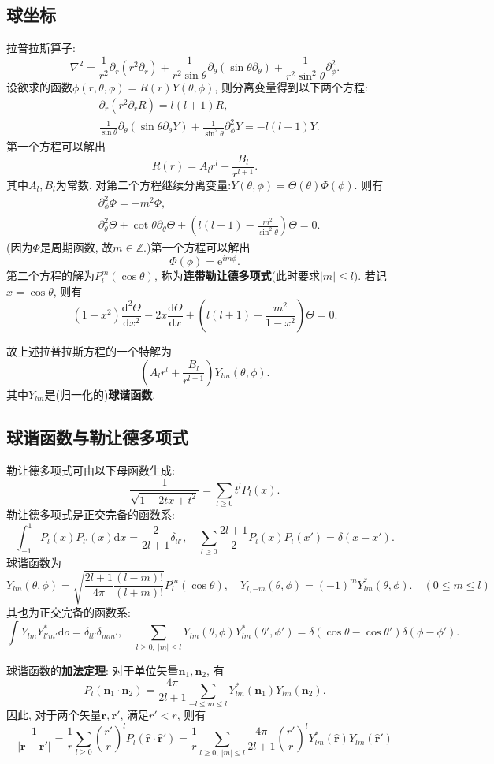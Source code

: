 \documentclass{article}
\newcommand\del{\partial}
\newcommand\bo[1]{\boldsymbol{#1}}
\renewcommand\d{\mathrm{d}}
\newcommand\e{\mathrm{e}}
\begin{document}
\subsection{球坐标}
拉普拉斯算子:
\[\nabla^2=\frac{1}{r^2}\del_r\left(r^2\del_r\right)+\frac{1}{r^2\sin\theta}\del_\theta\left(\sin\theta\del_\theta\right)+\frac{1}{r^2\sin^2\theta}\del_\phi^2.\]
设欲求的函数$\phi(r,\theta,\phi)=R(r)Y(\theta,\phi)$, 则分离变量得到以下两个方程:
\begin{align*}
    &\del_r\left(r^2\del_rR\right)=l(l+1)R,\\
    &\frac{1}{\sin\theta}\del_\theta\left(\sin\theta\del_\theta Y\right)+\frac{1}{\sin^2\theta}\del_\phi^2Y=-l(l+1)Y.
\end{align*}
第一个方程可以解出
\[R(r)=A_lr^l+\frac{B_l}{r^{l+1}}.\]
其中$A_l,B_l$为常数. 对第二个方程继续分离变量:$Y(\theta,\phi)=\Theta(\theta)\Phi(\phi)$. 则有
\begin{align*}
    &\del_\phi^2\Phi=-m^2\Phi,\\
    &\del_\theta^2\Theta+\cot\theta\del_\theta\Theta+\left(l(l+1)-\frac{m^2}{\sin^2\theta}\right)\Theta=0.
\end{align*}
(因为$\Phi$是周期函数, 故$m\in\mathbb{Z}$.)第一个方程可以解出
\[\Phi(\phi)=\e^{im\phi}.\]
第二个方程的解为$P_l^m(\cos\theta)$, 称为\textbf{连带勒让德多项式}(此时要求$|m|\le l$). 若记$x=\cos\theta$, 则有
\[(1-x^2)\frac{\d^2\Theta}{\d x^2}-2x\frac{\d\Theta}{\d x}+\left(l(l+1)-\frac{m^2}{1-x^2}\right)\Theta=0.\]\par
故上述拉普拉斯方程的一个特解为
\[\left(A_l r^l+\frac{B_l}{r^{l+1}}\right)Y_{lm}(\theta,\phi).\]
其中$Y_{lm}$是(归一化的)\textbf{球谐函数}.

\subsection{球谐函数与勒让德多项式}
勒让德多项式可由以下母函数生成:
\[\frac{1}{\sqrt{1-2tx+t^2}}=\sum_{l\ge0}t^lP_l(x).\]
勒让德多项式是正交完备的函数系:
\[\int_{-1}^1P_l(x)P_{l'}(x)\d x=\frac{2}{2l+1}\delta_{ll'},\quad \sum_{l\ge0}\frac{2l+1}{2}P_l(x)P_l(x')=\delta(x-x').\]
球谐函数为
\[Y_{lm}(\theta,\phi)=\sqrt{\frac{2l+1}{4\pi}\frac{(l-m)!}{(l+m)!}}P_l^{m}(\cos\theta),\quad Y_{l,-m}(\theta,\phi)=(-1)^mY^*_{lm}(\theta,\phi).\quad(0\le m\le l)\]
其也为正交完备的函数系:
\[\int Y_{lm}Y^*_{l'm'}\d o=\delta_{ll'}\delta_{mm'},\quad\sum_{l\ge 0,\ |m|\le l}Y_{lm}(\theta,\phi)Y^*_{lm}(\theta',\phi')=\delta(\cos\theta-\cos\theta')\delta(\phi-\phi').\]\par
球谐函数的\textbf{加法定理}: 对于单位矢量$\bo{n}_1,\bo{n}_2$, 有
\[P_l(\bo{n}_1\cdot\bo{n}_2)=\frac{4\pi}{2l+1}\sum_{-l\le m\le l}Y^*_{lm}(\bo   {n}_1)Y_{lm}(\bo{n}_2).\]
因此, 对于两个矢量$\bo{r},\bo{r}'$, 满足$r'<r$, 则有
\[\frac{1}{|\bo{r}-\bo{r}'|}=\frac{1}{r}\sum_{l\ge 0}\left(\frac{r'}{r}\right)^lP_l(\hat{\bo{r}}\cdot\hat{\bo{r}}')=\frac{1}{r}\sum_{l\ge0,\ |m|\le l}\frac{4\pi}{2l+1}\left(\frac{r'}{r}\right)^lY^*_{lm}(\hat{\bo{r}})Y_{lm}(\hat{\bo{r}}')\]
\end{document}
